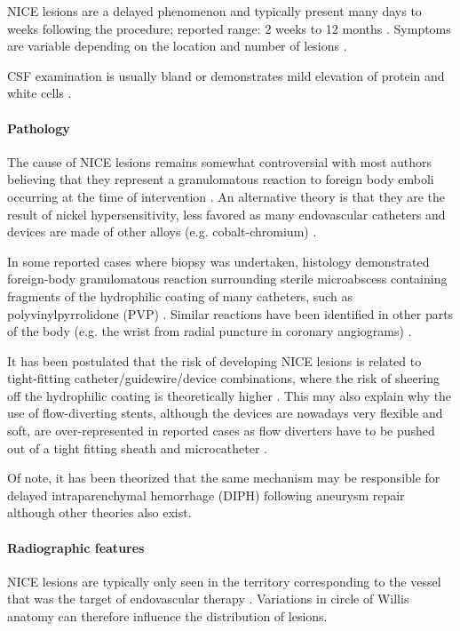 NICE lesions are a delayed phenomenon and typically present many days to weeks following the procedure; reported range: 2 weeks to 12 months . Symptoms are variable depending on the location and number of lesions .

CSF examination is usually bland or demonstrates mild elevation of protein and white cells .

\paragraph{Pathology}

The cause of NICE lesions remains somewhat controversial with most authors believing that they represent a granulomatous reaction to foreign body emboli occurring at the time of intervention . An alternative theory is that they are the result of nickel hypersensitivity, less favored as many endovascular catheters and devices are made of other alloys (e.g. cobalt-chromium) .

In some reported cases where biopsy was undertaken, histology demonstrated foreign-body granulomatous reaction surrounding sterile microabscess containing fragments of the hydrophilic coating of many catheters, such as polyvinylpyrrolidone (PVP) . Similar reactions have been identified in other parts of the body (e.g. the wrist from radial puncture in coronary angiograms) .

It has been postulated that the risk of developing NICE lesions is related to tight-fitting catheter/guidewire/device combinations, where the risk of sheering off the hydrophilic coating is theoretically higher . This may also explain why the use of flow-diverting stents, although the devices are nowadays very flexible and soft, are over-represented in reported cases as flow diverters have to be pushed out of a tight fitting sheath and microcatheter .

Of note, it has been theorized that the same mechanism may be responsible for delayed intraparenchymal hemorrhage (DIPH) following aneurysm repair  although other theories also exist.

\paragraph{Radiographic features}

NICE lesions are typically only seen in the territory corresponding to the vessel that was the target of endovascular therapy . Variations in circle of Willis anatomy can therefore influence the distribution of lesions.

